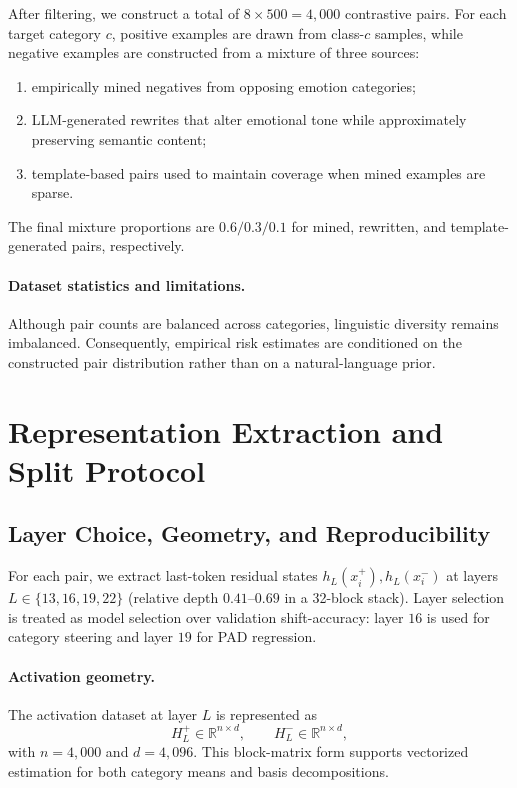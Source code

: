 After filtering, we construct a total of
$8 \times 500 = 4{,}000$ contrastive pairs.
For each target category $c$, positive examples are drawn from
class-$c$ samples, while negative examples are constructed from a mixture
of three sources:

\begin{enumerate}
    \item empirically mined negatives from opposing emotion categories;
    \item LLM-generated rewrites that alter emotional tone while
    approximately preserving semantic content;
    \item template-based pairs used to maintain coverage when mined
    examples are sparse.
\end{enumerate}

The final mixture proportions are
$0.6/0.3/0.1$ for mined, rewritten, and template-generated pairs,
respectively.
\paragraph{Dataset statistics and limitations.}
\label{sec:dev:data:limits}
Although pair counts are balanced across categories, linguistic
diversity remains imbalanced. Consequently, empirical risk estimates are
conditioned on the constructed pair distribution rather than on a
natural-language prior.

\section{Representation Extraction and Split Protocol}
\label{sec:dev:activations}

\subsection{Layer Choice, Geometry, and Reproducibility}
\label{sec:dev:activations:hooks}
For each pair, we extract last-token residual states
$h_L(x_i^+),h_L(x_i^-)$ at layers
$L\in\{13,16,19,22\}$ (relative depth $0.41$--$0.69$ in a 32-block
stack). Layer selection is treated as model selection over validation
shift-accuracy: layer $16$ is used for category steering and layer $19$
for PAD regression.

\paragraph{Activation geometry.}
\label{sec:dev:activations:storage}
The activation dataset at layer $L$ is represented as
\begin{equation}
  H_L^+\in\mathbb{R}^{n\times d},\qquad H_L^-\in\mathbb{R}^{n\times d},
\end{equation}
with $n=4{,}000$ and $d=4{,}096$. This block-matrix form supports
vectorized estimation for both category means and basis decompositions.

